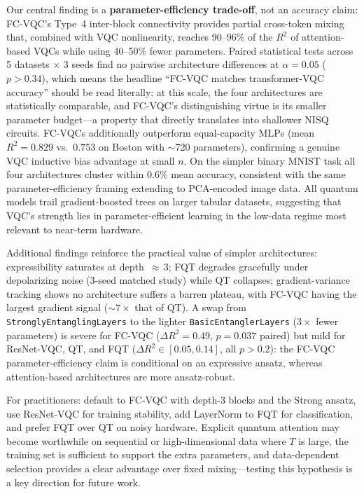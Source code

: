 \documentclass[10pt,conference]{IEEEtran}
\begin{document}
Our central finding is a \textbf{parameter-efficiency trade-off}, not an accuracy claim: FC-VQC's Type~4 inter-block connectivity provides partial cross-token mixing that, combined with VQC nonlinearity, reaches 90--96\% of the $R^2$ of attention-based VQCs while using 40--50\% fewer parameters.
Paired statistical tests across 5 datasets $\times$ 3 seeds find no pairwise architecture differences at $\alpha{=}0.05$ ($p{>}0.34$), which means the headline ``FC-VQC matches transformer-VQC accuracy'' should be read literally: at this scale, the four architectures are statistically comparable, and FC-VQC's distinguishing virtue is its smaller parameter budget---a property that directly translates into shallower NISQ circuits.
FC-VQCs additionally outperform equal-capacity MLPs (mean $R^2{=}0.829$ vs.\ $0.753$ on Boston with ${\sim}$720 parameters), confirming a genuine VQC inductive bias advantage at small $n$.
On the simpler binary MNIST task all four architectures cluster within 0.6\% mean accuracy, consistent with the same parameter-efficiency framing extending to PCA-encoded image data.
All quantum models trail gradient-boosted trees on larger tabular datasets, suggesting that VQC's strength lies in parameter-efficient learning in the low-data regime most relevant to near-term hardware.

Additional findings reinforce the practical value of simpler architectures: expressibility saturates at depth~${\approx}\,3$; FQT degrades gracefully under depolarizing noise (3-seed matched study) while QT collapses; gradient-variance tracking shows no architecture suffers a barren plateau, with FC-VQC having the largest gradient signal (${\sim}7\times$ that of QT).
A swap from \texttt{StronglyEntanglingLayers} to the lighter \texttt{BasicEntanglerLayers} ($3{\times}$ fewer parameters) is severe for FC-VQC ($\Delta R^2{=}0.49$, $p{=}0.037$ paired) but mild for ResNet-VQC, QT, and FQT ($\Delta R^2 \in [0.05, 0.14]$, all $p{>}0.2$): the FC-VQC parameter-efficiency claim is conditional on an expressive ansatz, whereas attention-based architectures are more ansatz-robust.

For practitioners: default to FC-VQC with depth-3 blocks and the Strong ansatz, use ResNet-VQC for training stability, add LayerNorm to FQT for classification, and prefer FQT over QT on noisy hardware.
Explicit quantum attention may become worthwhile on sequential or high-dimensional data where $T$ is large, the training set is sufficient to support the extra parameters, and data-dependent selection provides a clear advantage over fixed mixing---testing this hypothesis is a key direction for future work.




\end{document}
